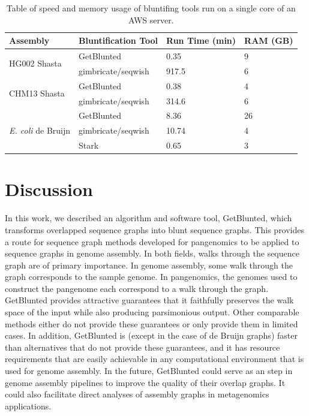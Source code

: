 \documentclass[11pt]{ucthesis}
\begin{document}

\begin{table}[h!]
\begin{center}
\begin{tabular}{ ||p{2cm}|p{3cm}|p{2.75cm}|p{2cm}|| }
\hline
Assembly & Bluntification Tool & Run Time (min) & RAM (GB) \\
\hline
\multirow{2}{2cm}{HG002 Shasta} & GetBlunted & 0.35 & 9 \\ 
&  gimbricate/seqwish  & 917.5 &  6 \\ 
\hline
\multirow{2}{2cm}{CHM13 Shasta} & GetBlunted & 0.38 & 4 \\ 
&  gimbricate/seqwish  & 314.6 &  6 \\ 
\hline
\multirow{3}{2cm}{\emph{E. coli} de Bruijn} & GetBlunted & 8.36 & 26 \\ 
&  gimbricate/seqwish  & 10.74 &  4 \\
& Stark & 0.65 & 3\\
\hline
\end{tabular}
\end{center}
\caption{Table of speed and memory usage of bluntifing tools run on a single core of an AWS server.}
\label{table:1}
\end{table}

\section{Discussion}

In this work, we described an algorithm and software tool, GetBlunted, which transforms overlapped sequence graphs into blunt sequence graphs. 
This provides a route for sequence graph methods developed for pangenomics to be applied to sequence graphs in genome assembly.
In both fields, walks through the sequence graph are of primary importance.
In genome assembly, some walk through the graph corresponds to the sample genome.
In pangenomics, the genomes used to construct the pangenome each correspond to a walk through the graph.
GetBlunted provides attractive guarantees that it faithfully preserves the walk space of the input while also producing parsimonious output.
Other comparable methods either do not provide these guarantees or only provide them in limited cases.
In addition, GetBlunted is (except in the case of de Bruijn graphs) faster than alternatives that do not provide these guarantees, and it has resource requirements that are easily achievable in any computational environment that is used for genome assembly.
In the future, GetBlunted could serve as an step in genome assembly pipelines to improve the quality of their overlap graphs.
It could also facilitate direct analyses of assembly graphs in metagenomics applications.
\end{document}
